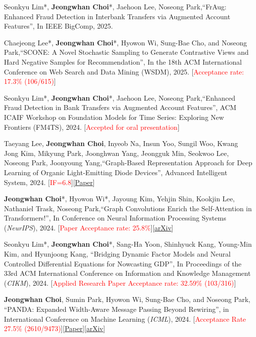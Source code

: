 \documentclass[10pt]{article}
\newenvironment{changemargin}[2]{
  \begin{list}{}{
    \setlength{\topsep}{0pt}
    \setlength{\leftmargin}{#1}
    \setlength{\rightmargin}{#2}
    \setlength{\listparindent}{\parindent}
    \setlength{\itemindent}{\parindent}
    \setlength{\parsep}{\parskip}
  }
  \item[]}{\end{list}
}
\newcommand{\presentation}[2]{
	{#1} \hfill \emph{#2}\\ \bigskip
}
\newcommand{\RED}[1]{\textcolor{red}{#1}}
\newenvironment{body} {
	\vspace*{-16pt}
	\begin{changemargin}{-0.25in}{-0.5in}
  }
	{\end{changemargin}
}
\begin{document}
\begin{body}
 \presentation{
Seonkyu Lim*, \textbf{Jeongwhan Choi}*, Jaehoon Lee, Noseong Park,``FrAug: Enhanced Fraud Detection in Interbank Transfers via Augmented Account Features'', In IEEE BigComp, 2025.}{}

\presentation{
Chaejeong Lee*, \textbf{Jeongwhan Choi}*, Hyowon Wi,  Sung-Bae Cho, and Noseong Park,``SCONE: A Novel Stochastic Sampling to Generate Contrastive Views and Hard Negative Samples for Recommendation'', In the 18th ACM International Conference on Web Search and Data Mining (WSDM), 2025. [\RED{Acceptance rate: 17.3\% (106/615)}]}{}

\presentation{
Seonkyu Lim*, \textbf{Jeongwhan Choi}*, Jaehoon Lee, Noseong Park,``Enhanced Fraud Detection in Bank Transfers via Augmented Account Features'', ACM ICAIF Workshop on Foundation Models for Time Series: Exploring New Frontiers (FM4TS), 2024. [\RED{Accepted for oral presentation}]}{}

\presentation{
Taeyang Lee, \textbf{Jeongwhan Choi}, Inyeob Na, Insun Yoo, Sungil Woo, Kwang Jong Kim, Mikyung Park, Joonghwan Yang, Jeongguk Min, Seokwoo Lee, Noseong Park, Joonyoung Yang,``Graph-Based Representation Approach for Deep Learning of Organic Light-Emitting Diode Devices'', Advanced Intelligent System, 2024. [\RED{IF=6.8}][\href{https://onlinelibrary.wiley.com/doi/10.1002/aisy.202400598}{Paper}]}{}

\presentation{
\textbf{Jeongwhan Choi}*, Hyowon Wi*, Jayoung Kim, Yehjin Shin, Kookjin Lee, Nathaniel Trask, Noseong Park,``Graph Convolutions Enrich the Self-Attention in Transformers!'', In Conference on Neural Information Processing Systems (\textit{NeurIPS}), 2024. [\RED{Paper Acceptance rate: 25.8\%}][\href{https://arxiv.org/abs/2312.04234}{arXiv}]}{}

\presentation{
 Seonkyu Lim*, \textbf{Jeongwhan Choi}*, Sang-Ha Yoon, Shinhyuck Kang, Young-Min Kim, and Hyunjoong Kang, ``Bridging Dynamic Factor Models and Neural Controlled Differential Equations for Nowcasting GDP'', In Proceedings of the 33rd ACM International Conference on Information and Knowledge Management (\textit{CIKM}), 2024. [\RED{Applied Research Paper Acceptance rate: 32.59\% (103/316)}]}{}

\presentation{
 \textbf{Jeongwhan Choi}, Sumin Park, Hyowon Wi,  Sung-Bae Cho, and Noseong Park, ``PANDA: Expanded Width-Aware Message Passing Beyond Rewiring'', in International Conference on Machine Learning (\textit{ICML}), 2024. [\RED{Acceptance Rate 27.5\% (2610/9473)}][\href{https://proceedings.mlr.press/v235/choi24f.html}{Paper}][\href{https://arxiv.org/abs/2406.03671}{arXiv}]}{}


\end{body}
\end{document}
